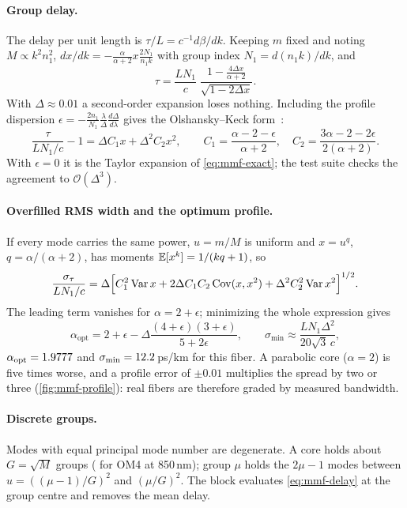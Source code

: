 \paragraph{Group delay.} The delay per unit length is $\tau/L=c^{-1}d\beta/dk$. Keeping $m$ fixed and
noting $M\propto k^2n_1^2$, $dx/dk=-\frac{\alpha}{\alpha+2}x\frac{2N_1}{n_1k}$ with group index $N_1=d(n_1k)/dk$, and
\begin{equation}
  \tau=\frac{LN_1}{c}\;\frac{1-\frac{4\Delta x}{\alpha+2}}{\sqrt{1-2\Delta x}} .
  \label{eq:mmf-exact}
\end{equation}
With $\Delta\approx0.01$ a second-order expansion loses nothing. Including the profile dispersion
$\epsilon=-\frac{2n_1}{N_1}\frac{\lambda}{\Delta}\frac{d\Delta}{d\lambda}$ gives the Olshansky--Keck
form~\cite{olshansky1976}:
\begin{equation}
  \frac{\tau}{LN_1/c}-1=\Delta C_1x+\Delta^2C_2x^2,\qquad
  C_1=\frac{\alpha-2-\epsilon}{\alpha+2},\quad C_2=\frac{3\alpha-2-2\epsilon}{2(\alpha+2)} .
  \label{eq:mmf-delay}
\end{equation}
With $\epsilon=0$ it is the Taylor expansion of \cref{eq:mmf-exact}; the test suite checks the agreement
to $\mathcal O(\Delta^3)$.

\paragraph{Overfilled RMS width and the optimum profile.} If every mode carries the same power,
$u=m/M$ is uniform and $x=u^q$, $q=\alpha/(\alpha+2)$, has moments $\mathbb{E}[x^k]=1/(kq+1)$, so
\begin{equation}
  \frac{\sigma_\tau}{LN_1/c}=\Delta\Big[C_1^2\operatorname{Var} x+2\Delta C_1C_2\operatorname{Cov}(x,x^2)+\Delta^2C_2^2\operatorname{Var} x^2\Big]^{1/2}.
\end{equation}
The leading term vanishes for $\alpha=2+\epsilon$; minimizing the whole expression gives~\cite{olshansky1976}
\begin{equation}
  \alpha_{\mathrm{opt}}=2+\epsilon-\Delta\frac{(4+\epsilon)(3+\epsilon)}{5+2\epsilon},\qquad
  \sigma_{\min}\approx\frac{LN_1\Delta^2}{20\sqrt3\,c},
\end{equation}
$\alpha_{\mathrm{opt}}=1.9777$ and $\sigma_{\min}=12.2$\,ps/km for this fiber. A parabolic core ($\alpha=2$) is five
times worse, and a profile error of $\pm0.01$ multiplies the spread by two or three
(\cref{fig:mmf-profile}): real fibers are therefore graded by measured bandwidth.

\paragraph{Discrete groups.} Modes with equal principal mode number are degenerate. A core holds
about $G=\sqrt M$ groups (\mmfgroups{} for OM4 at 850\,nm); group $\mu$ holds the $2\mu-1$ modes between
$u=((\mu-1)/G)^2$ and $(\mu/G)^2$. The block evaluates \cref{eq:mmf-delay} at the group centre and
removes the mean delay.

